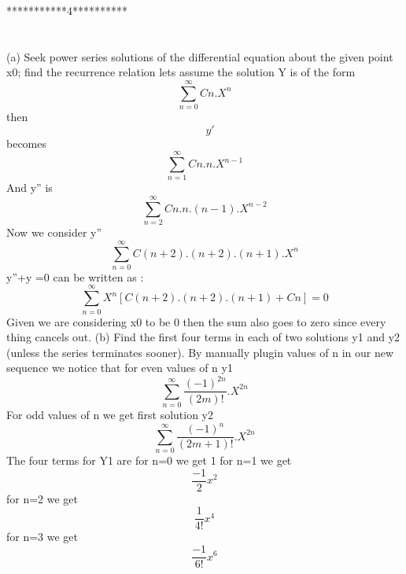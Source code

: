 \documentclass[onecolumn]{IEEEtran}
\begin{document}
 
 ***********4**********
\\
\\
\\
(a) Seek power series solutions of the differential equation about the given point x0; find the recurrence relation
lets assume the solution Y is of the form
\begin{equation}
     \sum_{n=0}^{\infty}Cn.X^{n}
    \end{equation}
    then \begin{equation}
   \quad y'      
    \end{equation} 
    becomes 
    \begin{equation}
     \sum_{n=1}^{\infty}Cn.n.X^{n-1}
    \end{equation}
    And \quad y'' is 
 \begin{equation}
     \sum_{n=2}^{\infty}Cn.n.(n-1).X^{n-2}
    \end{equation}
Now we consider \quad y''
\begin{equation}
     \sum_{n=0}^{\infty}C(n+2).(n+2).(n+1).X^{n}
    \end{equation}
 \quad y''+\quad y =0 
can be written as :
\begin{equation}
     \sum_{n=0}^{\infty}X^{n}[ C(n+2).(n+2).(n+1)+Cn]=0
    \end{equation}
    Given we are considering x0 to be 0 then the sum also goes to zero since every thing cancels out.
  (b) Find the first four terms in each of two solutions y1 and y2 (unless the series terminates sooner).
By manually plugin values of n in our new sequence we notice that 
for even values of n y1 
\begin{equation}
     \sum_{n=0}^{\infty}\frac{(-1)^{2n}}{(2m)!}.X^{2n}
    \end{equation}
    For odd values of n we get first solution y2
\begin{equation}
     \sum_{n=0}^{\infty}\frac{(-1)^{n}}{(2m+1)!}.X^{2n}
    \end{equation}
    The four terms for Y1 are
    for n=0 we get 1
      for n=1 we get
 \begin{equation}
      \frac{-1}{2}x^{2}
    \end{equation}
     for n=2 we get
      \begin{equation}
      \frac{1}{4!}x^{4}
    \end{equation}
     for n=3 we get
      \begin{equation}
      \frac{-1}{6!}x^{6}
    \end{equation}
\end{document}
